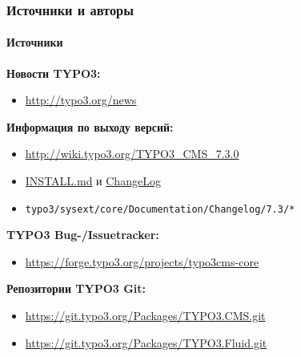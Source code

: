 \begin{frame}[fragile]
	\frametitle{Источники и авторы}
	\framesubtitle{Источники}

	\textbf{Новости TYPO3:}
		\begin{itemize}\smaller
			\item \url{http://typo3.org/news}
		\end{itemize}

	\textbf{Информация по выходу версий:}
		\begin{itemize}\smaller
			\item \url{http://wiki.typo3.org/TYPO3_CMS_7.3.0}
			\item \href{https://github.com/TYPO3/TYPO3.CMS/blob/master/INSTALL.md}{INSTALL.md} и \href{https://github.com/TYPO3/TYPO3.CMS/blob/master/ChangeLog}{ChangeLog}
			\item \texttt{typo3/sysext/core/Documentation/Changelog/7.3/*}
		\end{itemize}

	\textbf{TYPO3 Bug-/Issuetracker:}
		\begin{itemize}\smaller
			\item \url{https://forge.typo3.org/projects/typo3cms-core}
		\end{itemize}

	\textbf{Репозитории TYPO3 Git:}
		\begin{itemize}\smaller
			\item \url{https://git.typo3.org/Packages/TYPO3.CMS.git}
			\item \url{https://git.typo3.org/Packages/TYPO3.Fluid.git}
		\end{itemize}

\end{frame}


